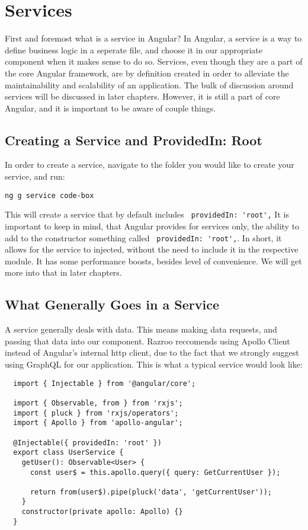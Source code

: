 \section{ Services }
\maketitle{}

First and foremost what is a service in Angular? In Angular, a service is a way
to define business logic in a seperate file, and choose it in our appropriate 
component when it makes sense to do so. Services, even though they are a part 
of the core Angular framework, are by definition created in order to alleviate 
the maintainability and scalability of an application. The bulk of discussion 
around services will be discussed in later chapters. However, it is still a 
part of core Angular, and it is important to be aware of couple things. 

\subsection{ Creating a Service and ProvidedIn: Root }
In order to create a service, navigate to the folder you would like to create 
your service, and run: 
\begin{lstlisting}
ng g service code-box  
\end{lstlisting}

This will create a service that by default includes 
\lstinline{ providedIn: 'root',} It is important to keep in mind, that Angular
provides for services only, the  ability to add to the constructor something 
called \lstinline{ providedIn: 'root',}. In short, it allows for the service 
to injected, without the need to include it in the respective module. It has 
some performance boosts, besides level of convenience. We will get more into 
that in later chapters. 

\subsection{ What Generally Goes in a Service }
A service generally deals with data. This means making data requests, and 
passing that data into our component. Razroo reccomends using Apollo Client
instead of Angular's internal http client, due to the fact that we strongly 
suggest using GraphQL for our application. This is what a typical service 
would look like: 
\begin{lstlisting}
  import { Injectable } from '@angular/core';
  
  import { Observable, from } from 'rxjs';
  import { pluck } from 'rxjs/operators';
  import { Apollo } from 'apollo-angular';
  
  @Injectable({ providedIn: 'root' })
  export class UserService {
    getUser(): Observable<User> {
      const user$ = this.apollo.query({ query: GetCurrentUser });
  
      return from(user$).pipe(pluck('data', 'getCurrentUser'));
    }
    constructor(private apollo: Apollo) {}
  }
\end{lstlisting}

